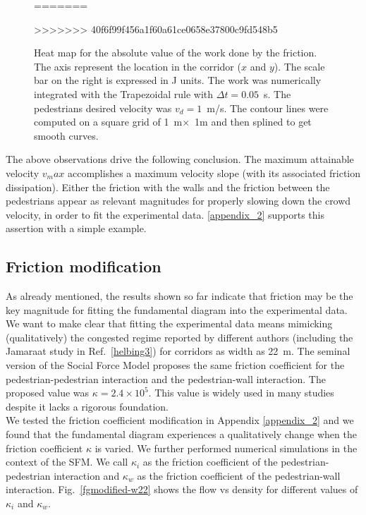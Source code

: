 \begin{figure}[!htbp]
=======
\caption[width=0.47\columnwidth] {Heat map for the absolute value of the work done by the friction. The axis represent the location in the corridor ($x$ and $y$). The scale bar on the right is expressed in J units. The work was numerically integrated with the Trapezoidal rule with $\Delta t =0.05$~s. The pedestrians desired velocity was $v_d = 1$~m/s. The contour lines were computed on a square grid of 1~m$\times$~1m and then splined to get smooth curves.} 
>>>>>>> 40f6f99f456a1f60a61ce0658e37800c9fd548b5
 \label{abswg}
\end{figure}

The above observations drive the following conclusion. The maximum attainable velocity $v_max$ accomplishes a maximum velocity slope (with its associated friction dissipation). Either the friction with the walls and the friction between the pedestrians appear as relevant magnitudes for properly slowing down the crowd velocity, in order to fit the experimental data. \ref{appendix_2} supports this assertion with a simple example.  

\subsection{Friction modification}

As already mentioned, the results shown so far indicate that friction may be the key magnitude for fitting the fundamental diagram into the experimental data. We want to make clear that fitting the experimental data means mimicking (qualitatively) the congested regime reported by different authors (including the Jamaraat study in Ref.~\ref{helbing3}) for corridors as width as 22~m. The seminal version of the Social Force Model proposes the same friction coefficient for the pedestrian-pedestrian interaction and the pedestrian-wall interaction. The proposed value was $\kappa = 2.4\times10^{5}$. This value is widely used in many studies despite it lacks a rigorous foundation. \\

We tested the friction coefficient modification in Appendix \ref{appendix_2} and we found that the fundamental diagram experiences a qualitatively change when the friction coefficient $\kappa$ is varied. We further performed numerical simulations in the context of the SFM. We call $\kappa_i$ as the friction coefficient of the pedestrian-pedestrian interaction and $\kappa_w$ as the friction coefficient of the pedestrian-wall interaction. Fig.~\ref{fgmodified-w22} shows the flow vs density for different values of $\kappa_i$ and $\kappa_w$.\\

